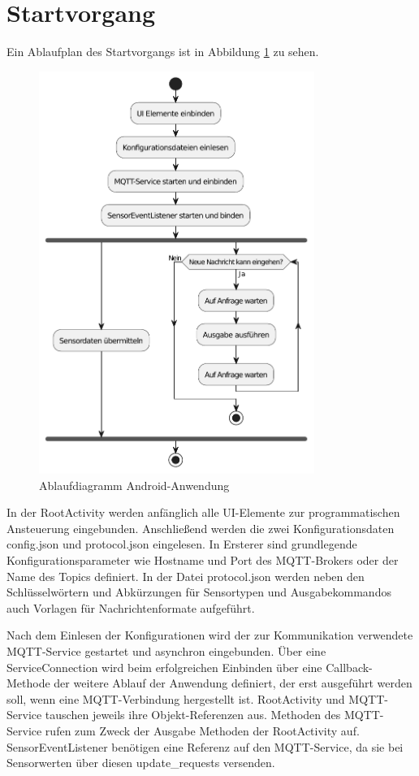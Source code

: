 \documentclass[11pt,a4paper]{report}
\begin{document}
\section{Startvorgang}
Ein Ablaufplan des Startvorgangs ist in Abbildung \ref{fig:app_flow} zu sehen.
\begin{figure}[htbp]
  \centering
  \includegraphics[width=0.8\textwidth]{images/app_ablauf}
  \caption{Ablaufdiagramm Android-Anwendung}
  \label{fig:app_flow}
\end{figure}
In der RootActivity werden anfänglich alle UI-Elemente zur programmatischen Ansteuerung eingebunden.
Anschließend werden die zwei Konfigurationsdaten config.json und protocol.json eingelesen.
In Ersterer sind grundlegende Konfigurationsparameter wie Hostname und Port des MQTT-Brokers oder der Name des Topics definiert.
In der Datei protocol.json werden neben den Schlüsselwörtern und Abkürzungen für Sensortypen und Ausgabekommandos auch Vorlagen für Nachrichtenformate aufgeführt.

Nach dem Einlesen der Konfigurationen wird der zur Kommunikation verwendete MQTT-Service gestartet und asynchron eingebunden.
Über eine ServiceConnection wird beim erfolgreichen Einbinden über eine Callback-Methode der weitere Ablauf der Anwendung definiert, der erst ausgeführt werden soll, wenn eine MQTT-Verbindung hergestellt ist.
RootActivity und MQTT-Service tauschen jeweils ihre Objekt-Referenzen aus.
Methoden des MQTT-Service rufen zum Zweck der Ausgabe Methoden der RootActivity auf.
SensorEventListener benötigen eine Referenz auf den MQTT-Service, da sie bei Sensorwerten über diesen update\_requests versenden.
\end{document}
